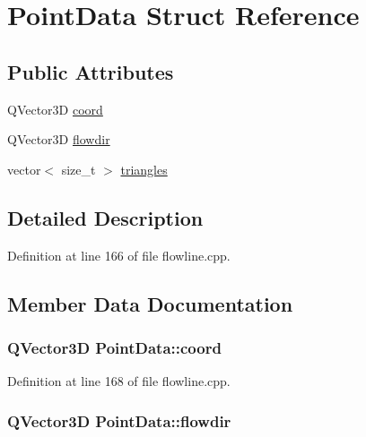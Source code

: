 \hypertarget{structPointData}{}\section{Point\+Data Struct Reference}
\label{structPointData}
\subsection*{Public Attributes}
\begin{DoxyCompactItemize}
\item 
Q\+Vector3D \hyperlink{structPointData_a36b2f6a6c661e48f0ca5fade9d01372c}{coord}
\item 
Q\+Vector3D \hyperlink{structPointData_a605965356cbc5e71fea58fd30605bba8}{flowdir}
\item 
vector$<$ size\+\_\+t $>$ \hyperlink{structPointData_a7de97589578b881bc7850ac0053c8613}{triangles}
\end{DoxyCompactItemize}


\subsection{Detailed Description}


Definition at line 166 of file flowline.\+cpp.



\subsection{Member Data Documentation}
\subsubsection[{\texorpdfstring{coord}{coord}}]{\setlength{\rightskip}{0pt plus 5cm}Q\+Vector3D Point\+Data\+::coord}\hypertarget{structPointData_a36b2f6a6c661e48f0ca5fade9d01372c}{}\label{structPointData_a36b2f6a6c661e48f0ca5fade9d01372c}


Definition at line 168 of file flowline.\+cpp.

\subsubsection[{\texorpdfstring{flowdir}{flowdir}}]{\setlength{\rightskip}{0pt plus 5cm}Q\+Vector3D Point\+Data\+::flowdir}\hypertarget{structPointData_a605965356cbc5e71fea58fd30605bba8}{}\label{structPointData_a605965356cbc5e71fea58fd30605bba8}



